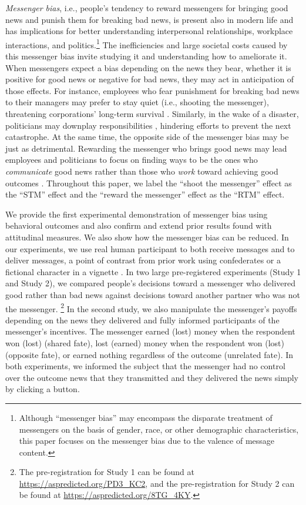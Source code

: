 \emph{Messenger bias}, i.e., people's tendency to reward messengers for
bringing good news and punish them for breaking bad news, is present
also in modern life and has implications for better understanding
interpersonal relationships, workplace interactions, and
politics.\footnote{Although ``messenger bias'' may encompass the
  disparate treatment of messengers on the basis of gender, race, or
  other demographic characteristics, this paper focuses on the messenger
  bias due to the valence of message content.} The inefficiencies and
large societal costs caused by this messenger bias invite studying it
and understanding how to ameliorate it. When messengers expect a bias
depending on the news they bear, whether it is positive for good news or
negative for bad news, they may act in anticipation of those effects.
For instance, employees who fear punishment for breaking bad news to
their managers may prefer to stay quiet (i.e., shooting the messenger),
threatening corporations' long-term survival \citep{charan2002companies}.
Similarly, in the wake of a disaster, politicians may downplay
responsibilities \citep{liu2020framing}, hindering efforts to prevent the
next catastrophe. At the same time, the opposite side of the messenger
bias may be just as detrimental. Rewarding the messenger who brings good
news may lead employees and politicians to focus on finding ways to be
the ones who \emph{communicate} good news rather than those who
\emph{work} toward achieving good outcomes \citep[see, e.g.,][]{grimmer2014impression}.
Throughout this paper, we label the ``shoot the
messenger'' effect as the ``STM'' effect and the ``reward the
messenger'' effect as the ``RTM'' effect.

We provide the first experimental demonstration of messenger bias using
behavioral outcomes and also confirm and extend prior results found with
attitudinal measures. We also show how the messenger bias
can be reduced. In our experiments, we use real human participant to
both receive messages and to deliver messages, a point of contrast from
prior work using confederates or a fictional character in a vignette \citep{kuhlen2013language}. 
In two large pre-registered experiments (Study 1 and Study 2), we compared
people's decisions toward a messenger who delivered good rather than bad
news against decisions toward another partner who was not the messenger.
\footnote{The pre-registration for Study 1 can be found at \url{https://aspredicted.org/PD3_KC2}, 
and the pre-registration for Study 2 can be found at 
\url{https://aspredicted.org/8TG_4KY}.} 
 In
the second study, we also manipulate the messenger's payoffs depending
on the news they delivered and fully informed participants of the
messenger's incentives. The messenger earned (lost) money when the
respondent won (lost) (shared fate), lost (earned) money when the respondent
won (lost) (opposite fate), or earned nothing regardless of the outcome
(unrelated fate). In both experiments, we informed the subject that the
messenger had no control over the outcome news that they transmitted and
they delivered the news simply by clicking a button.


